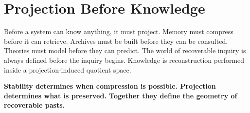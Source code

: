\section{Projection Before Knowledge}

Before a system can know anything, it must project. Memory must compress before it can retrieve. Archives must be built before they can be consulted. Theories must model before they can predict. The world of recoverable inquiry is always defined before the inquiry begins. Knowledge is reconstruction performed inside a projection-induced quotient space.

\textbf{Stability determines when compression is possible. Projection determines what is preserved. Together they define the geometry of recoverable pasts.}
